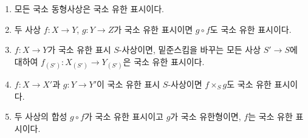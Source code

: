 \begin{proposition}[1.4.3]
\label{IV.1.4.3-fr}
\begin{enumerate}
  \item[(i)] 모든 국소 동형사상은 국소 유한 표시이다.
  \item[(ii)] 두 사상 $f:X\to Y$, $g:Y\to Z$가 국소 유한 표시이면
  $g\circ f$도 국소 유한 표시이다.


  \item[(iii)] $f:X\to Y$가 국소 유한 표시 $S$-사상이면, 밑준스킴을
  바꾸는 모든 사상 $S'\to S$에 대하여
  $f_{(S')}:X_{(S')}\to Y_{(S')}$은 국소 유한 표시이다.
  \item[(iv)] $f:X\to X'$과 $g:Y\to Y'$이 국소 유한 표시
  $S$-사상이면 $f\times_Sg$도 국소 유한 표시이다.
  \item[(v)] 두 사상의 합성 $g\circ f$가 국소 유한 표시이고 $g$가
  국소 유한형이면, $f$는 국소 유한 표시이다.
\end{enumerate}
\end{proposition}

